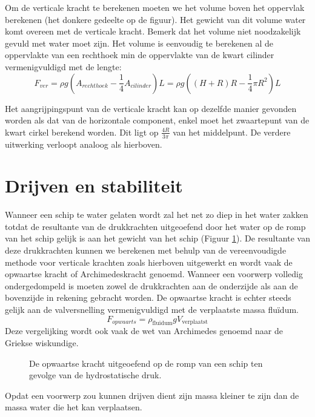 Om de verticale kracht te berekenen moeten we het volume boven het oppervlak berekenen (het donkere gedeelte op de figuur). Het gewicht van dit volume water komt overeen met de verticale kracht. Bemerk dat het volume niet noodzakelijk gevuld met water moet zijn. Het volume is eenvoudig te berekenen al de oppervlakte van een rechthoek min de oppervlakte van de kwart cilinder vermenigvuldigd met de lengte:
\begin{equation}
	F_{ver} = \rho g (A_{rechthoek} - \frac{1}{4}A_{cilinder}) L  = \rho g \left( (H+R)R - \frac{1}{4} \pi R^2 \right) L
\end{equation}

Het aangrijpingspunt van de verticale kracht kan op dezelfde manier gevonden worden als dat van de horizontale component, enkel moet het zwaartepunt van de kwart cirkel berekend worden. Dit ligt op $\frac{4R}{3\pi}$ van het middelpunt. De verdere uitwerking verloopt analoog als hierboven.

	\section{Drijven en stabiliteit}
Wanneer een schip te water gelaten wordt zal het net zo diep in het water zakken totdat de resultante van de drukkrachten uitgeoefend door het water op de romp van het schip gelijk is aan het gewicht van het schip (Figuur \ref{fig:opwaartse_kracht}). De resultante van deze drukkrachten kunnen we berekenen met behulp van de vereenvoudigde methode voor verticale krachten zoals hierboven uitgewerkt en wordt vaak de opwaartse kracht of Archimedeskracht genoemd. Wanneer een voorwerp volledig ondergedompeld is moeten zowel de drukkrachten aan de onderzijde als aan de bovenzijde in rekening gebracht worden. De opwaartse kracht is echter steeds gelijk aan de valversnelling vermenigvuldigd met de verplaatste massa fluïdum.
\begin{equation}
	F_{opwaarts} = \rho_{\text{fluïdum}} g V_{\text{verplaatst}}
\end{equation}
Deze vergelijking wordt ook vaak de wet van Archimedes genoemd naar de Griekse wiskundige.
\begin{figure}[htb]
	\centering
	
	\caption{De opwaartse kracht uitgeoefend op de romp van een schip ten gevolge van de hydrostatische druk.}
	\label{fig:opwaartse_kracht}
\end{figure}

Opdat een voorwerp zou kunnen drijven dient zijn massa kleiner te zijn dan de massa water die het kan verplaatsen.

